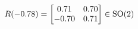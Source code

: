 \documentclass[preview]{standalone}
\begin{document}
\begin{align*}
\special{dvisvgm:raw <g id='unique000'>}R(-0.78) = \begin{bmatrix} 0.71 & 0.70 \\ -0.70 & 0.71 \end{bmatrix} \in \text{SO}(2)\special{dvisvgm:raw </g>}
\end{align*}
\end{document}

